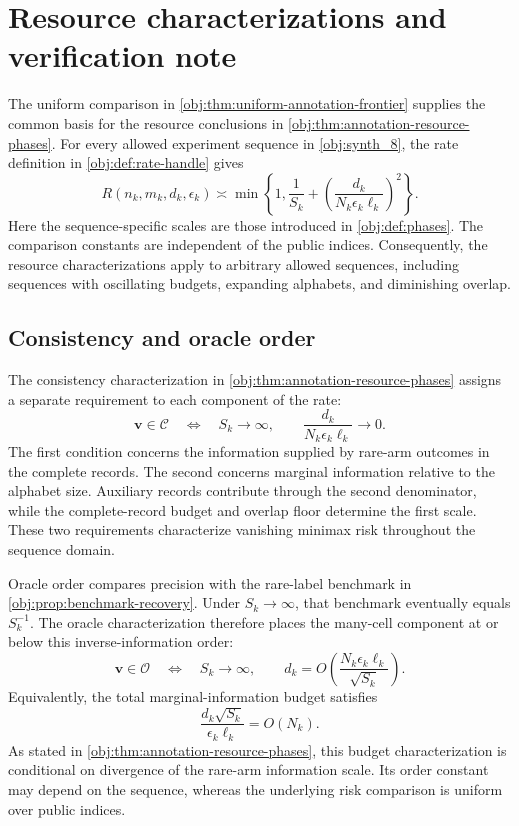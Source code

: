 \section{Resource characterizations and verification note}

The uniform comparison in \cref{obj:thm:uniform-annotation-frontier} supplies the common basis for the resource conclusions in \cref{obj:thm:annotation-resource-phases}. For every allowed experiment sequence in \cref{obj:synth_8}, the rate definition in \cref{obj:def:rate-handle} gives
\[
R(n_k,m_k,d_k,\epsilon_k)
\asymp
\min\left\{
1,\frac{1}{S_k}
+\left(\frac{d_k}{N_k\epsilon_k\ell_k}\right)^2
\right\}.
\]
Here the sequence-specific scales are those introduced in \cref{obj:def:phases}. The comparison constants are independent of the public indices. Consequently, the resource characterizations apply to arbitrary allowed sequences, including sequences with oscillating budgets, expanding alphabets, and diminishing overlap.

\subsection{Consistency and oracle order}

The consistency characterization in \cref{obj:thm:annotation-resource-phases} assigns a separate requirement to each component of the rate:
\[
\mathbf v\in\mathcal C
\quad\Longleftrightarrow\quad
S_k\longrightarrow\infty,
\qquad
\frac{d_k}{N_k\epsilon_k\ell_k}\longrightarrow0.
\]
The first condition concerns the information supplied by rare-arm outcomes in the complete records. The second concerns marginal information relative to the alphabet size. Auxiliary records contribute through the second denominator, while the complete-record budget and overlap floor determine the first scale. These two requirements characterize vanishing minimax risk throughout the sequence domain.

Oracle order compares precision with the rare-label benchmark in \cref{obj:prop:benchmark-recovery}. Under \(S_k\to\infty\), that benchmark eventually equals \(S_k^{-1}\). The oracle characterization therefore places the many-cell component at or below this inverse-information order:
\[
\mathbf v\in\mathcal O
\quad\Longleftrightarrow\quad
S_k\longrightarrow\infty,
\qquad
d_k=O\left(
\frac{N_k\epsilon_k\ell_k}{\sqrt{S_k}}
\right).
\]
Equivalently, the total marginal-information budget satisfies
\[
\frac{d_k\sqrt{S_k}}{\epsilon_k\ell_k}=O(N_k).
\]
As stated in \cref{obj:thm:annotation-resource-phases}, this budget characterization is conditional on divergence of the rare-arm information scale. Its order constant may depend on the sequence, whereas the underlying risk comparison is uniform over public indices.

